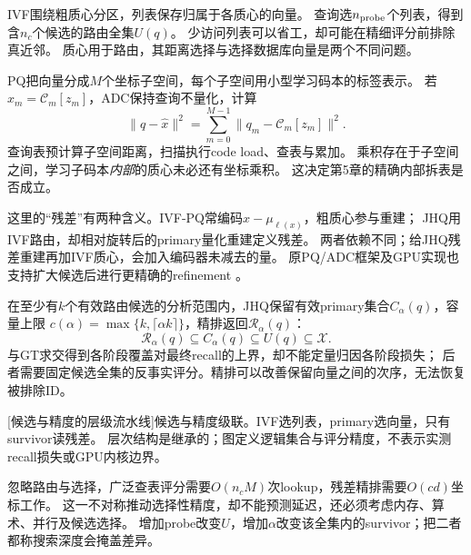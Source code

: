 IVF围绕粗质心分区，列表保存归属于各质心的向量。
查询选$n_{\rm probe}$个列表，得到含$n_c$个候选的路由全集$U(q)$。
少访问列表可以省工，却可能在精细评分前排除真近邻。
质心用于路由，其距离选择与选择数据库向量是两个不同问题。

PQ把向量分成$M$个坐标子空间，每个子空间用小型学习码本的标签表示\cite{pq}。
若$\widehat x_m=\mathcal C_m[z_m]$，ADC保持查询不量化，计算
\begin{equation}
 \|q-\widehat x\|^2=\sum_{m=0}^{M-1}\|q_m-\mathcal C_m[z_m]\|^2.
 \label{eq:2-adc}
\end{equation}
查询表预计算子空间距离，扫描执行code load、查表与累加。
乘积存在于子空间之间，学习子码本\emph{内部}的质心未必还有坐标乘积。
这决定第5章的精确内部拆表是否成立。

这里的“残差”有两种含义。IVF-PQ常编码$x-\mu_{\ell(x)}$，粗质心参与重建；
JHQ用IVF路由，却相对旋转后的primary量化重建定义残差。
两者依赖不同；给JHQ残差重建再加IVF质心，会加入编码器未减去的量。
原PQ/ADC框架及GPU实现也支持扩大候选后进行更精确的refinement
\cite{johnson_gpu,faiss_refine}。

在至少有$k$个有效路由候选的分析范围内，JHQ保留有效primary集合$C_\alpha(q)$，容量上限
$c(\alpha)=\max\{k,\lceil\alpha k\rceil\}$，精排返回$\mathcal R_\alpha(q)$：
\begin{equation}
 \mathcal R_\alpha(q)\subseteq C_\alpha(q)\subseteq U(q)\subseteq\mathcal X.
 \label{eq:2-cascade}
\end{equation}
与GT求交得到各阶段覆盖对最终recall的上界，却不能定量归因各阶段损失；
后者需要固定候选全集的反事实评分。精排可以改善保留向量之间的次序，无法恢复被排除ID。

\par\medskip\noindent\begin{minipage}{\linewidth}
\centering\captionsetup{hypcap=false}
\resizebox{\linewidth}{!}{}
[候选与精度的层级流水线]{候选与精度级联。IVF选列表，primary选向量，只有survivor读残差。
层次结构是继承的；图定义逻辑集合与评分精度，不表示实测recall损失或GPU内核边界。}
\label{fig:2-cascade}
\end{minipage}\par\medskip

忽略路由与选择，广泛查表评分需要$O(n_cM)$次lookup，残差精排需要$O(cd)$坐标工作。
这一不对称推动选择性精度，却不能预测延迟，还必须考虑内存、算术、并行及候选选择。
增加probe改变$U$，增加$\alpha$改变该全集内的survivor；把二者都称搜索深度会掩盖差异。
